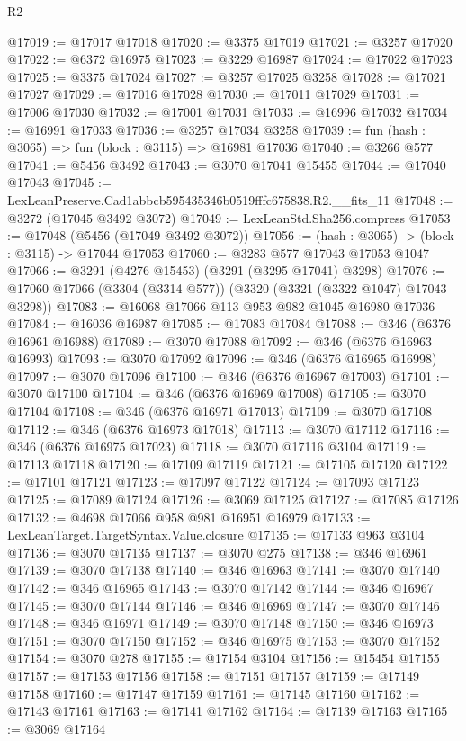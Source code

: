 \begin{lexlean}{R2}
\begin{coremodule}
@17019 := @17017 @17018
@17020 := @3375 @17019
@17021 := @3257 @17020
@17022 := @6372 @16975
@17023 := @3229 @16987
@17024 := @17022 @17023
@17025 := @3375 @17024
@17027 := @3257 @17025 @3258
@17028 := @17021 @17027
@17029 := @17016 @17028
@17030 := @17011 @17029
@17031 := @17006 @17030
@17032 := @17001 @17031
@17033 := @16996 @17032
@17034 := @16991 @17033
@17036 := @3257 @17034 @3258
@17039 := fun (hash : @3065) => fun (block : @3115) => @16981 @17036
@17040 := @3266 @577
@17041 := @5456 @3492
@17043 := @3070 @17041 @15455
@17044 := @17040 @17043
@17045 := LexLeanPreserve.Cad1abbcb595435346b0519fffc675838.R2.__fits_11
@17048 := @3272 (@17045 @3492 @3072)
@17049 := LexLeanStd.Sha256.compress
@17053 := @17048 (@5456 (@17049 @3492 @3072))
@17056 := (hash : @3065) -> (block : @3115) -> @17044 @17053
@17060 := @3283 @577 @17043 @17053 @1047
@17066 := @3291 (@4276 @15453) (@3291 (@3295 @17041) @3298)
@17076 := @17060 @17066 (@3304 (@3314 @577)) (@3320 (@3321 (@3322 @1047) @17043 @3298))
@17083 := @16068 @17066 @113 @953 @982 @1045 @16980 @17036
@17084 := @16036 @16987
@17085 := @17083 @17084
@17088 := @346 (@6376 @16961 @16988)
@17089 := @3070 @17088
@17092 := @346 (@6376 @16963 @16993)
@17093 := @3070 @17092
@17096 := @346 (@6376 @16965 @16998)
@17097 := @3070 @17096
@17100 := @346 (@6376 @16967 @17003)
@17101 := @3070 @17100
@17104 := @346 (@6376 @16969 @17008)
@17105 := @3070 @17104
@17108 := @346 (@6376 @16971 @17013)
@17109 := @3070 @17108
@17112 := @346 (@6376 @16973 @17018)
@17113 := @3070 @17112
@17116 := @346 (@6376 @16975 @17023)
@17118 := @3070 @17116 @3104
@17119 := @17113 @17118
@17120 := @17109 @17119
@17121 := @17105 @17120
@17122 := @17101 @17121
@17123 := @17097 @17122
@17124 := @17093 @17123
@17125 := @17089 @17124
@17126 := @3069 @17125
@17127 := @17085 @17126
@17132 := @4698 @17066 @958 @981 @16951 @16979
@17133 := LexLeanTarget.TargetSyntax.Value.closure
@17135 := @17133 @963 @3104
@17136 := @3070 @17135
@17137 := @3070 @275
@17138 := @346 @16961
@17139 := @3070 @17138
@17140 := @346 @16963
@17141 := @3070 @17140
@17142 := @346 @16965
@17143 := @3070 @17142
@17144 := @346 @16967
@17145 := @3070 @17144
@17146 := @346 @16969
@17147 := @3070 @17146
@17148 := @346 @16971
@17149 := @3070 @17148
@17150 := @346 @16973
@17151 := @3070 @17150
@17152 := @346 @16975
@17153 := @3070 @17152
@17154 := @3070 @278
@17155 := @17154 @3104
@17156 := @15454 @17155
@17157 := @17153 @17156
@17158 := @17151 @17157
@17159 := @17149 @17158
@17160 := @17147 @17159
@17161 := @17145 @17160
@17162 := @17143 @17161
@17163 := @17141 @17162
@17164 := @17139 @17163
@17165 := @3069 @17164

\end{coremodule}
\end{lexlean}
